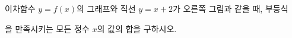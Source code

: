 \noindent\begin{minipage}[t]{0.58\linewidth}\vspace{0pt}\raggedright 이차함수 $y=f(x)$의 그래프와 직선 $y=x+2$가 오른쪽 그림과 같을 때, 부등식 \par\smallskip\end{minipage}\hfill\begin{minipage}[t]{0.4\linewidth}\vspace{0pt}\centering \resizebox{\ifdim\width>\linewidth\linewidth\else\width\fi}{!}{}\end{minipage}\par
\noindent {}\par\smallskip\noindent 을 만족시키는 모든 정수 $x$의 값의 합을 구하시오.
